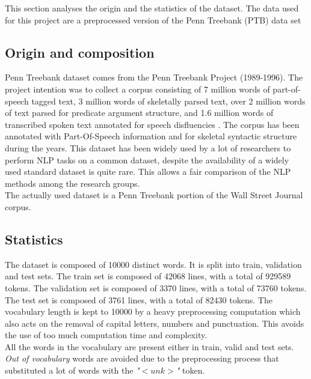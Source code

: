 This section analyses the origin and the statistics of the dataset. The data used for this project are a preprocessed version of the Penn
Treebank (PTB) data set \cite{TreebankPenn}

\subsection{Origin and composition}

Penn Treebank dataset comes from the Penn Treebank Project (1989-1996).  The project intention was to collect a corpus consisting of 7 million words of part-of-speech tagged text, 3 million words of skeletally parsed text, over 2 million words of text parsed for predicate argument structure, and 1.6 million words of transcribed spoken text annotated for speech disfluencies \cite{treebankProject}. The corpus has been annotated with Part-Of-Speech information and for skeletal syntactic structure during the years. This dataset has been widely used by a lot of researchers to perform NLP tasks on a common dataset, despite the availability of a widely used standard dataset is quite rare. This allows a fair comparison of the NLP methods among the research groups. \\
The actually used dataset is a Penn Treebank portion of the Wall Street Journal corpus. 

\subsection{Statistics}
The dataset is composed of 10000 distinct words. It is split into train, validation and test sets. The train set is composed of 42068 lines, with a total of 929589 tokens. The validation set is composed of 3370 lines, with a total of 73760 tokens. The test set is composed of 3761 lines, with a total of 82430 tokens. The vocabulary length is kept to 10000 by a heavy preprocessing computation which also acts on the removal of capital letters, numbers and punctuation. This avoids the use of too much computation time and complexity. \\
All the words in the vocabulary are present either in train, valid and test sets. \emph{Out of vocabulary} words are avoided due to the preprocessing process that substituted a lot of words with the \textit{"$<unk>$"} token.